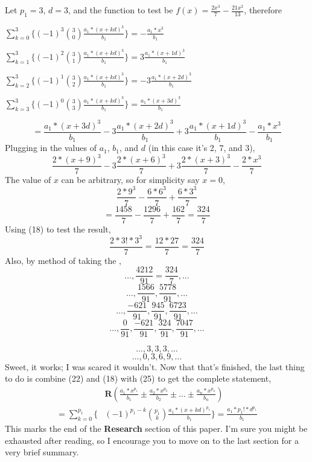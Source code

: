 \documentclass[12pt, letterpaper]{report}
\begin{document}
Let $p_{1}=3$, $d=3$, and the function to test be $f(x)=\frac{2x^3}{7}-\frac{21x^2}{13}$, therefore
\begin{flushleft}
$\sum_{k=0}^{3}\{ (-1)^{3}\binom{3}{0}\frac{a_{1}*(x+kd)^{3}}{b_{1}}\}=-\frac{a_{1}*x^3}{b_{1}}$
\end{flushleft}
\begin{flushleft}
$\sum_{k=1}^{3}\{ (-1)^{2}\binom{3}{1}\frac{a_{1}*(x+kd)^{3}}{b_{1}}\}=3\frac{a_{1}*(x+1d)^3}{b_{1}}$
\end{flushleft}
\begin{flushleft}
$\sum_{k=2}^{3}\{ (-1)^{1}\binom{3}{2}\frac{a_{1}*(x+kd)^{3}}{b_{1}}\}=-3\frac{a_{1}*(x+2d)^3}{b_{1}}$
\end{flushleft}
\begin{flushleft}
$\sum_{k=3}^{3}\{ (-1)^{0}\binom{3}{3}\frac{a_{1}*(x+kd)^{3}}{b_{1}}\}=\frac{a_{1}*(x+3d)^3}{b_{1}}$
\end{flushleft}
$$=\frac{a_{1}*(x+3d)^3}{b_{1}}-3\frac{a_{1}*(x+2d)^3}{b_{1}}+3\frac{a_{1}*(x+1d)^3}{b_{1}}-\frac{a_{1}*x^3}{b_{1}}$$
Plugging in the values of $a_{1}$, $b_{1}$, and $d$ (in this case it's 2, 7, and 3),
$$\frac{2*(x+9)^3}{7}-3\frac{2*(x+6)^3}{7}+3\frac{2*(x+3)^3}{7}-\frac{2*x^3}{7}$$
The value of $x$ can be arbitrary, so for simplicity say $x=0$,
$$\frac{2*9^3}{7}-\frac{6*6^3}{7}+\frac{6*3^3}{7}$$
$$=\frac{1458}{7}-\frac{1296}{7}+\frac{162}{7}=\frac{324}{7}$$
Using (18) to test the result,
$$\frac{2*3!*3^{3}}{7}=\frac{12*27}{7}=\frac{324}{7}$$
Also, by method of taking the ,
$$\dots, \frac{4212}{91}=\frac{324}{7}, \dots$$
$$\dots, \frac{1566}{91}, \frac{5778}{91}, \dots$$
$$\dots, \frac{-621}{91}, \frac{945}{91}, \frac{6723}{91}, \dots$$
$$\dots, \frac{0}{91}, \frac{-621}{91}, \frac{324}{91}, \frac{7047}{91}, \dots$$

$$\dots, 3, 3, 3, \dots$$
$$\dots, 0, 3, 6, 9, \dots$$
Sweet, it works; I was scared it wouldn't. Now that that's finished, the last thing to do is combine (22) and (18) with (25) to get the complete statement,
\begin{equation}
\begin{split}
&\textbf{R}(\frac{a_{1}*x^{p_{1}}}{b_{1}} \pm \frac{a_{2}*x^{p_{2}}}{b_{2}} \pm \dots \pm \frac{a_{n}*x^{p_{n}}}{b_{n}}) \\
=\sum_{k=0}^{p_{1}}\{ &(-1)^{p_{1}-k}\binom{p_{1}}{k}\frac{a_{1}*(x+kd)^{p_{1}}}{b_{1}}\}=\frac{a_{1}*p_{1}!*d^{p_{1}}}{b_{1}}
\end{split}
\end{equation}
This marks the end of the \textbf{Research} section of this paper. I'm sure you might be exhausted after reading, so I encourage you to move on to the last section for a very brief summary.
\end{document}
